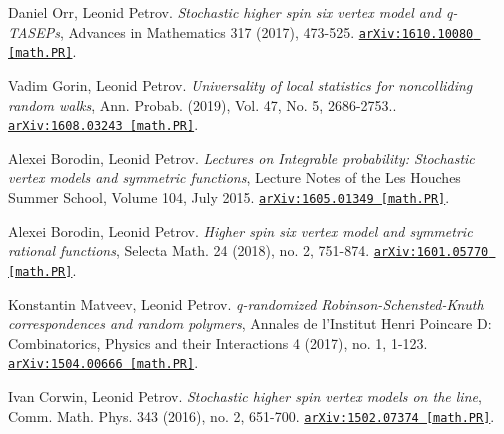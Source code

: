 \begin{etaremune}
\item 
Daniel Orr, Leonid Petrov.
\emph{Stochastic higher spin six vertex model and q-TASEPs}, Advances in Mathematics 317 (2017), 473-525. 
\href{https://arxiv.org/abs/1610.10080}{\texttt{arXiv:1610.10080 [math.PR]}}.









\item 
Vadim Gorin, Leonid Petrov.
\emph{Universality of local statistics for noncolliding random walks}, Ann. Probab. (2019), Vol. 47, No. 5, 2686-2753.. 
\href{https://arxiv.org/abs/1608.03243}{\texttt{arXiv:1608.03243 [math.PR]}}.



\item 
Alexei Borodin, Leonid Petrov.
\emph{Lectures on Integrable probability: Stochastic vertex models and symmetric functions}, Lecture Notes of the Les Houches Summer School, Volume 104, July 2015. 
\href{https://arxiv.org/abs/1605.01349}{\texttt{arXiv:1605.01349 [math.PR]}}.



\item 
Alexei Borodin, Leonid Petrov.
\emph{Higher spin six vertex model and symmetric rational functions}, Selecta Math. 24 (2018), no. 2, 751-874. 
\href{https://arxiv.org/abs/1601.05770}{\texttt{arXiv:1601.05770 [math.PR]}}.









\item 
Konstantin Matveev, Leonid Petrov.
\emph{q-randomized Robinson-Schensted-Knuth correspondences and random polymers}, Annales de l’Institut Henri Poincare D: Combinatorics, Physics and their Interactions 4 (2017), no. 1, 1-123. 
\href{https://arxiv.org/abs/1504.00666}{\texttt{arXiv:1504.00666 [math.PR]}}.





\item 
Ivan Corwin, Leonid Petrov.
\emph{Stochastic higher spin vertex models on the line}, Comm. Math. Phys. 343 (2016), no. 2, 651-700. 
\href{https://arxiv.org/abs/1502.07374}{\texttt{arXiv:1502.07374 [math.PR]}}.














\end{etaremune}
